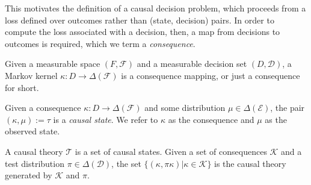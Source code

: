 This motivates the definition of a causal decision problem, which proceeds from a loss defined over outcomes rather than (state, decision) pairs. In order to compute the loss associated with a decision, then, a map from decisions to outcomes is required, which we term a \emph{consequence}. 

\begin{definition}[Consequences]
Given a measurable space $(F,\mathcal{F})$ and a measurable decision set $(D,\mathcal{D})$, a Markov kernel $\kappa:D \to \Delta(\mathcal{F})$ is a consequence mapping, or just a consequence for short.
\end{definition}

\begin{definition}
Given a consequence $\kappa:D\to \Delta(\mathcal{F})$ and some distribution $\mu\in \Delta(\mathcal{E})$, the pair $(\kappa,\mu):=\tau$ is a \emph{causal state}. We refer to $\kappa$ as the consequence and $\mu$ as the observed state.
\end{definition}

\begin{definition}\label{def:causal_theory}
A causal theory $\mathscr{T}$ is a set of causal states. Given a set of consequences $\mathscr{K}$ and a test distribution $\pi\in \Delta(\mathcal{D})$, the set $\{(\kappa,\pi\kappa)|\kappa\in \mathscr{K}\}$ is the causal theory generated by $\mathscr{K}$ and $\pi$.
\end{definition}

